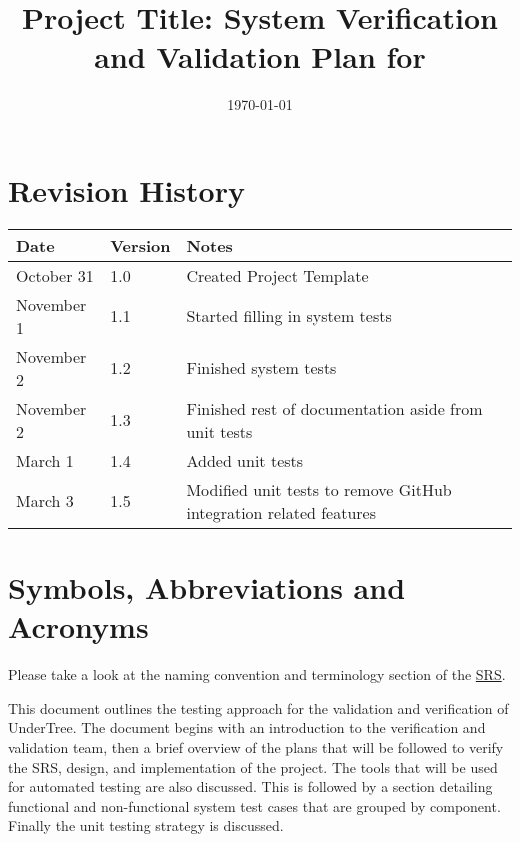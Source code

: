 \documentclass[12pt, titlepage]{article}
\begin{document}
	
	\title{Project Title: System Verification and Validation Plan for \progname{}} 
	\author{\authname}
	\date{\today}
	
	\maketitle
	
	
	\section{Revision History}
	
	\begin{tabularx}{\textwidth}{p{3cm}p{2cm}X}
		\toprule {\bf Date} & {\bf Version} & {\bf Notes}\\
		\midrule
		October 31 & 1.0 & Created Project Template\\
		November 1 & 1.1 & Started filling in system tests\\
		November 2 & 1.2 & Finished system tests\\
		November 2 & 1.3 & Finished rest of documentation aside from unit tests\\
		March 1 & 1.4 & Added unit tests\\
		March 3 & 1.5 & Modified unit tests to remove GitHub integration related features\\
		\bottomrule
	\end{tabularx}
	
	\newpage
	
	\tableofcontents
	
	\listoftables
	
	\newpage
	
	\section{Symbols, Abbreviations and Acronyms}
	
	Please take a look at the naming convention and terminology section of the \href{https://github.com/RutheniumVI/UnderTree/blob/main/docs/SRS/SRS.pdf}{SRS}.
	
	\newpage
	
	
	This document outlines the testing approach for the validation and verification of UnderTree. The document begins with an introduction to the verification and validation team, then a brief overview of the plans that will be followed to verify the SRS, design, and implementation of the project. The tools that will be used for automated testing are also discussed. This is followed by a section detailing functional and non-functional system test cases that are grouped by component. Finally the unit testing strategy is discussed. 
	
\end{document}
